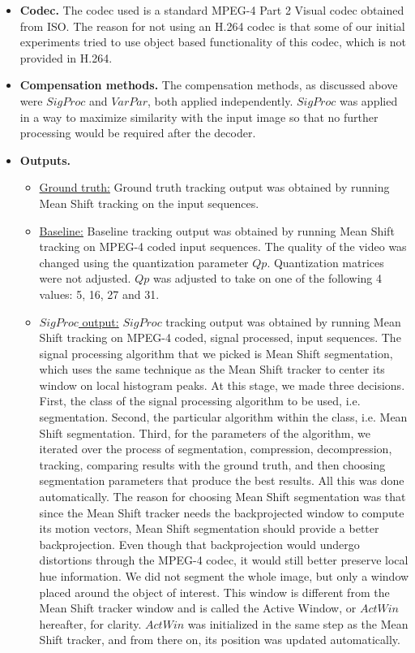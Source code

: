 \documentclass{article}
\begin{document}
\begin{itemize}
\begin{itemize}
\item \textbf{Codec.}  The codec used is a standard MPEG-4 Part 2 Visual codec obtained from ISO.  The reason for not using an H.264 codec is that some of our initial experiments tried to use object based functionality of this codec, which is not provided in H.264.  
\item \textbf{Compensation methods.}  The compensation methods, as discussed above were $SigProc$ and $VarPar$, both applied independently.  $SigProc$ was applied in a way to maximize similarity with the input image so that no further processing would be required after the decoder.
\item \textbf{Outputs.}
\begin{itemize}
\item \underline{Ground truth:}  Ground truth tracking output was obtained by running Mean Shift tracking on the input sequences.
\item \underline{Baseline:}  Baseline tracking output was obtained by running Mean Shift tracking on MPEG-4 coded input sequences.  The quality of the video was changed using the quantization parameter $Qp$.  Quantization matrices were not adjusted.  $Qp$ was adjusted to take on one of the following 4 values: 5, 16, 27 and 31.  
\item \underline{$SigProc$ output:}  $SigProc$ tracking output was obtained by running Mean Shift tracking on MPEG-4 coded, signal processed, input sequences.  The signal processing algorithm that we picked is Mean Shift segmentation, which uses the same technique as the Mean Shift tracker to center its window on local histogram peaks.  At this stage, we made three decisions.  First, the class of the signal processing algorithm to be used, i.e. segmentation.  Second, the particular algorithm within the class, i.e. Mean Shift segmentation.  Third, for the parameters of the algorithm, we iterated over the process of segmentation, compression, decompression, tracking, comparing results with the ground truth, and then choosing segmentation parameters that produce the best results.  All this was done automatically.  The reason for choosing Mean Shift segmentation was that since the Mean Shift tracker needs the backprojected window to compute its motion vectors, Mean Shift segmentation should provide a better backprojection.  Even though that backprojection would undergo distortions through the MPEG-4 codec, it would still better preserve local hue information.  We did not segment the whole image, but only a window placed around the object of interest.  This window is different from the Mean Shift tracker window and is called the Active Window, or $ActWin$ hereafter, for clarity.  $ActWin$ was initialized in the same step as the Mean Shift tracker, and from there on, its position was updated automatically.  

\end{itemize}
\end{itemize}
\end{itemize}
\end{document}
